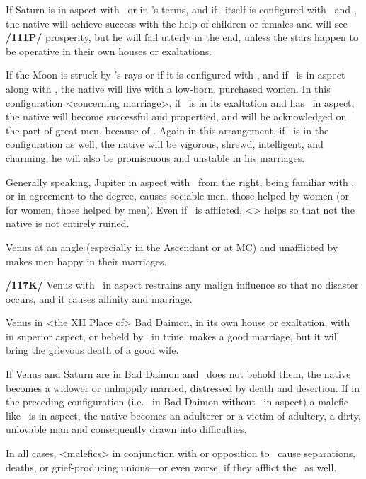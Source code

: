If Saturn is in aspect with \Venus\, or in \Venus’s terms, and if \Venus\, itself is configured with \Jupiter\, and \Mars, the native will achieve success with the help of children or females and will see \textbf{/111P/} prosperity, but  he will fail utterly in the end, unless the stars happen to be operative in their own houses or
exaltations. 

If the Moon is struck by \Jupiter’s rays or if it is configured with \Jupiter, and if \Saturn\, is in aspect along with \Jupiter, the native will live with a low-born, purchased women. In this configuration <concerning marriage>, if \Venus\, is in its exaltation and has \Jupiter\, in aspect, the native will become successful and propertied, and will be acknowledged on the part of great men, because of \Venus. Again in this arrangement, if \Mercury\, is in the configuration as well, the native will be vigorous, shrewd, intelligent, and charming; he will also be promiscuous and unstable in his marriages. 

Generally speaking, Jupiter in aspect with \Venus\, from the right, being familiar with \Venus, or in agreement to the degree, causes sociable men, those helped by women (or for women, those helped by men). Even if \Venus\, is afflicted, <\Jupiter> helps so that not the native is not entirely ruined.

Venus at an angle (especially in the Ascendant or at MC) and unafflicted by \Saturn\, makes men happy
in their marriages. 

\textbf{/117K/} Venus with \Jupiter\, in aspect restrains any malign influence so that no disaster occurs, and it causes affinity and marriage. 

Venus in <the XII Place of> Bad Daimon, in its own house or exaltation, with \Jupiter\, in superior aspect, or beheld by \Jupiter\, in trine, makes a good marriage, but it will bring the grievous death of a good wife. 

If Venus and Saturn are in Bad Daimon and \Jupiter\, does not behold them, the native becomes a widower or unhappily married, distressed by death and desertion. If in the preceding configuration (i.e. \Venus\, in Bad Daimon without \Jupiter\, in aspect) a malefic like \Mars\, is in aspect, the native becomes an adulterer or a victim of adultery, a dirty, unlovable man and consequently drawn into difficulties. 

In all cases, <malefics> in conjunction with or opposition to \Venus\, cause separations, deaths, or grief-producing unions—or even worse, if they afflict the \Moon\, as well.

